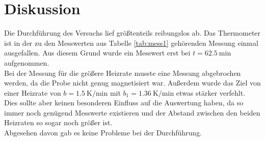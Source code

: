\newpage
\section{Diskussion}

\noindent
Die Durchführung des Versuchs lief größtenteils reibungslos ab.
Das Thermometer ist in der zu den Messwerten aus Tabelle \ref{tab:mess1} gehörenden Messung einmal ausgefallen. Aus diesem Grund wurde ein Messwert erst bei $t = \SI{62.5}{\minute}$ aufgenommen.\\
Bei der Messung für die größere Heizrate musste eine Messung abgebrochen werden, da die Probe nicht genug magnetisiert war.
Außerdem wurde das Ziel von einer Heizrate von $b =\SI{1.5}{\kelvin\per\minute}$ mit $b_1 =\SI{1.36}{\kelvin\per\minute}$ etwas stärker verfehlt.
Dies sollte aber keinen besonderen Einfluss auf die Auswertung haben, da so immer noch genügend Messwerte existieren und der Abstand zwischen den beiden Heizraten so sogar noch größer ist.\\
Abgesehen davon gab es keine Probleme bei der Durchführung.\\

